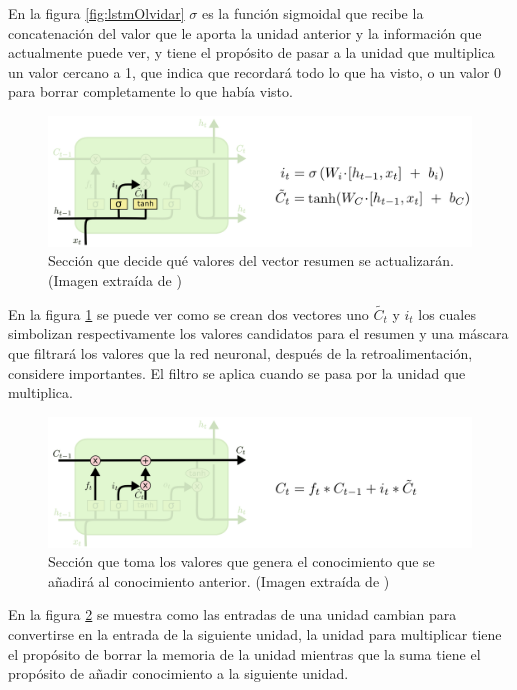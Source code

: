 \par En la figura \ref{fig:lstmOlvidar} $\sigma$ es la función sigmoidal que recibe la concatenación del valor que le aporta la unidad anterior y la información que actualmente puede ver, y tiene el propósito de pasar a la unidad que multiplica un valor cercano a 1, que indica que recordará todo lo que ha visto, o un valor 0 para borrar completamente lo que había visto.

\begin{figure}[H]
	\centering
	\includegraphics[width=\textwidth]{imagenes/LSTM3-focus-i.png}
	\caption[]{Sección que decide qué valores del vector resumen se actualizarán. (Imagen extraída de \textcite{christopher_olah_2015})}
	\label{fig:lstmAnadir}
\end{figure}


\par En la figura \ref{fig:lstmAnadir} se puede ver como se crean dos vectores uno $\widetilde{C_t}$ y $i_t$ los cuales simbolizan respectivamente los valores candidatos para el resumen y una máscara que filtrará los valores que la red neuronal, después de la retroalimentación, considere importantes. El filtro se aplica cuando se pasa por la unidad que multiplica.

\begin{figure}[H]
	\centering
	\includegraphics[width=\textwidth]{imagenes/LSTM3-focus-C.png}
	\caption[]{Sección que toma los valores que genera el conocimiento que se añadirá al conocimiento anterior. (Imagen extraída de \textcite{christopher_olah_2015})}
	\label{fig:lstmSuma}
\end{figure}

\par En la figura \ref{fig:lstmSuma} se muestra como las entradas de una unidad cambian para convertirse en la entrada de la siguiente unidad, la unidad para multiplicar tiene el propósito de borrar la memoria de la unidad mientras que la suma tiene el propósito de añadir conocimiento a la siguiente unidad.

